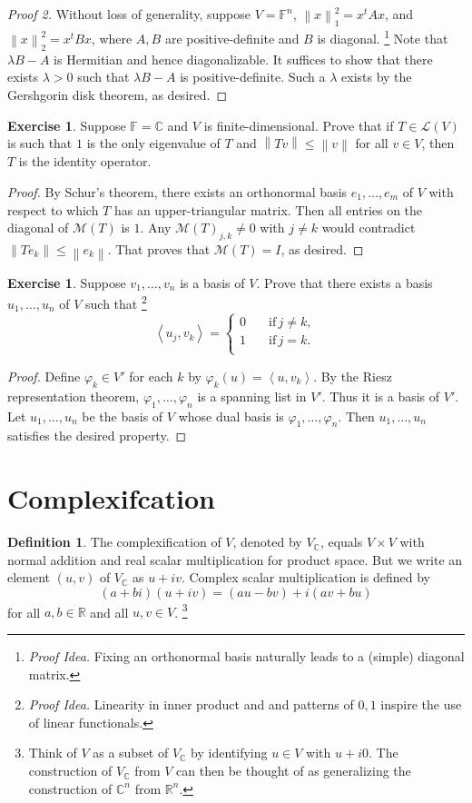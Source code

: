 \documentclass[colorlinks]{tufte-handout}
\theoremstyle{plain} %
\theoremstyle{definition}
\newtheorem{defn}[thm]{Definition}
\newtheorem{exer}[thm]{Exercise}
\theoremstyle{remark}
\def\idea{\textit{\color[rgb]{0,0,.55}Proof Idea. }}
\newcommand{\norm}[1]{\mathopen{}\left\lVert#1\right\rVert}
\newcommand{\inp}[2]{\mathopen{}\left\langle#1,#2\right\rangle}
\renewcommand{\phi}{\varphi}
\newcommand{\R}{\mathbb{R}}
\newcommand{\C}{\mathbb{C}}
\newcommand{\F}{\mathbb{F}}
\renewcommand{\L}{\mathcal{L}}
\newcommand{\M}{\mathcal{M}}
\renewcommand{\intercal}{t}
\begin{document}
\begin{proof}[Proof 2]
	Without loss of generality, suppose $V=\F^n$, $\norm{x}_1^2=x^\intercal Ax$, and $\norm{x}_2^2=x^\intercal Bx$, where $A,B$ are positive-definite and $B$ is diagonal.%
	\footnote{\idea Fixing an orthonormal basis naturally leads to a (simple) diagonal matrix.}
	Note that $\lambda B-A$ is Hermitian and hence diagonalizable. It suffices to show that there exists $\lambda>0$ such that $\lambda B-A$ is positive-definite. Such a $\lambda$ exists by the Gershgorin disk theorem, as desired.
\end{proof}

\begin{exer}
	Suppose $\F=\C$ and $V$ is finite-dimensional. Prove that if $T\in\L(V)$ is such that $1$ is the only eigenvalue of $T$ and $\norm{Tv}\leq\norm{v}$ for all $v\in V$, then $T$ is the identity operator.
\end{exer}
\begin{proof}
	By Schur's theorem, there exists an orthonormal basis $e_1,\dots,e_m$ of $V$ with respect to which $T$ has an upper-triangular matrix. Then all entries on the diagonal of $\M(T)$ is $1$. Any $\M(T)_{j,k}\neq0$ with $j\neq k$ would contradict $\norm{Te_k}\leq\norm{e_k}$. That proves that $\M(T)=I$, as desired.
\end{proof}

\begin{exer}
	Suppose $v_1,\dots,v_n$ is a basis of $V$. Prove that there exists a basis $u_1,\dots,u_n$ of $V$ such that%
	\footnote{\idea Linearity in inner product and and patterns of $0,1$ inspire the use of linear functionals.}
	\[\inp{u_j}{v_k}=\left\{\begin{aligned}
		0 \quad & \text{if}\, j\neq k,\\
		1 \quad & \text{if}\, j=k.\\
	\end{aligned}\right.\]
\end{exer}
\begin{proof}
	Define $\phi_k\in V'$ for each $k$ by $\phi_k(u)=\inp{u}{v_k}$. By the Riesz representation theorem, $\phi_1,\dots,\phi_n$ is a spanning list in $V'$. Thus it is a basis of $V'$. Let $u_1,\dots,u_n$ be the basis of $V$ whose dual basis is $\phi_1,\dots,\phi_n$. Then $u_1,\dots,u_n$ satisfies the desired property.
\end{proof}


\section{Complexifcation}
\begin{defn}
	The complexification of $V$, denoted by $V_\C$, equals $V\times V$ with normal addition and real scalar multiplication for product space. But we write an element $(u,v)$ of $V_\C$ as $u+iv$. Complex scalar multiplication is defined by
	\[(a+bi)(u+iv)=(au-bv)+i(av+bu)\]
	for all $a,b\in\R$ and all $u,v\in V$.%
	\footnote{Think of $V$ as a subset of $V_\C$ by identifying $u\in V$ with $u+i0$. The construction of $V_\C$ from $V$ can then be thought of as generalizing the construction of $\C^n$ from $\R^n$.}
\end{defn}
\end{document}
